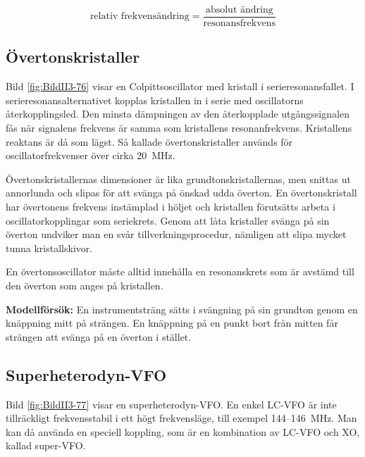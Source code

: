 \[
\text{relativ frekvensändring} =
\frac{\text{absolut ändring}}{\text{resonansfrekvens}}
\]

\subsection{Övertonskristaller}


Bild \ref{fig:BildII3-76} visar en Colpittsoscillator med kristall i
serieresonansfallet.
I serieresonansalternativet kopplas kristallen in i serie med
oscillatorns återkopplingsled.
Den minsta dämpningen av den återkopplade utgångssignalen fås när signalens
frekvens är samma som kristallens resonanfrekvens.
Kristallens reaktans är då som lägst.
Så kallade övertonskristaller används för oscillatorfrekvenser över cirka 20~MHz.

Övertonskristallernas dimensioner är lika grundtonskristallernas, men
snittas ut annorlunda och slipas för att svänga på önskad udda överton.
En övertonskristall har övertonens frekvens instämplad i höljet och kristallen
förutsätts arbeta i oscillatorkopplingar som seriekrets.
Genom att låta kristaller svänga på sin överton undviker man en svår
tillverkningsprocedur, nämligen att slipa mycket tunna kristallskivor.

En övertonsoscillator måste alltid innehålla en resonanskrets som är
avstämd till den överton som anges på kristallen.

\textbf{Modellförsök:}
En instrumentsträng sätts i svängning på sin grundton genom en knäppning mitt
på strängen.
En knäppning på en punkt bort från mitten får strängen att svänga på en överton
i stället.

\subsection{Superheterodyn-VFO}
\label{superVFO}


Bild \ref{fig:BildII3-77} visar en superheterodyn-VFO.
En enkel LC-VFO är inte tillräckligt frekvensstabil i ett högt frekvensläge,
till exempel 144--146~MHz.
Man kan då använda en speciell koppling, som är en kombination av LC-VFO och
XO, kallad super-VFO.

